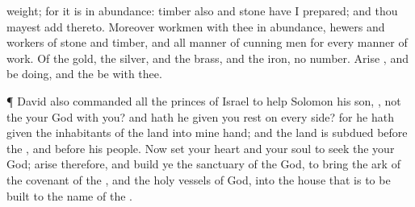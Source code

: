 {weight; for it is in
abundance:
timber also and
stone have I
prepared; and thou mayest
add thereto.
Moreover
{}
workmen with thee in
abundance,
hewers and
workers of
stone and
timber, and all manner of cunning
men for every manner of
work.
Of the
gold, the
silver, and the
brass, and the
iron,
{} no
number.
Arise
{}, and be
doing, and the
{} be with thee.
\par }{\PP {}¶
David also
commanded all the
princes of
Israel to
help
Solomon his
son,
{},
 not the
{} your
God with you? and hath he
{} given you
rest on every
side? for he hath
given the
inhabitants of the
land into mine
hand; and the
land is
subdued
before the
{}, and
before his
people.
Now
set your
heart and your
soul to
seek the
{} your
God;
arise therefore, and
build ye the
sanctuary of the
{}
God, to
bring the
ark of the
covenant of the
{}, and the
holy
vessels of
God, into the
house that is to be
built to the
name of the
{}.

}
